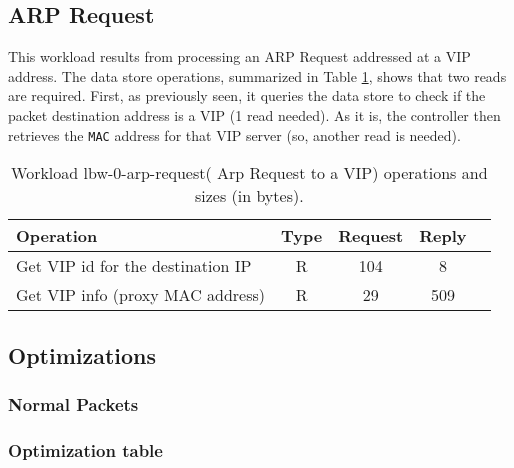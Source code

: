 \subsection{ARP Request}
This workload  results  from processing an ARP Request addressed at a
VIP address. The data store operations, summarized in Table
\ref{table:lbw-0-arp-request}, shows that two reads are
required. First, as previously seen,  it queries the data
store to check if the packet destination address is a VIP (1 read
needed). As it is, the controller then retrieves the \texttt{MAC} address for that
VIP server (so, another read is needed).

\begin{table}[ht]
\small
\centering 
\begin{tabular}{l c c c c}
Operation & Type & Request & Reply \\ \toprule 
Get VIP id for the destination IP  & R & 104 & 8\\\midrule
Get VIP info (proxy MAC address) & R & 29 & 509 \\\bottomrule
\end{tabular}\caption[Workload lbw-0-arp-request( Arp Request to a
VIP) operations]{Workload lbw-0-arp-request( Arp Request to a VIP)
 operations and sizes (in bytes).}
\label{table:lbw-0-arp-request}
\end{table}



\subsection{Optimizations}
\subsubsection{Normal Packets}

\begin{itemize}
\end{itemize}


\subsubsection{Optimization table}

